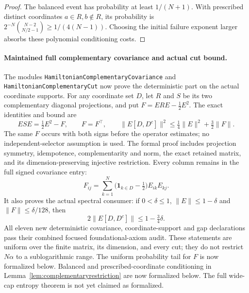 \begin{proof}
The balanced event has probability at least \(1/(N+1)\).
With prescribed distinct coordinates \(a\in R,b\notin R\),
its probability is
\(2^{-N}\binom{N-2}{N/2-1}\geq1/(4(N-1))\).
Choosing the initial failure exponent larger absorbs these
polynomial conditioning costs.
\end{proof}

\paragraph{Maintained full complementary covariance and actual cut bound.}
The modules \texttt{HamiltonianComplementaryCovariance} and
\texttt{HamiltonianComplementaryCut} now prove the deterministic
part on the actual coordinate supports.
For any coordinate set \(D\), let \(R\) and \(S\) be its two
complementary diagonal projections, and put
\(F=ERE-\tfrac12E^2\).
The exact identities and bound are
\[
 ESE=\tfrac12E^2-F,\qquad F=F^\top,\qquad
 \|E[D,D^c]\|^2\leq\tfrac14\|E\|^2+\tfrac32\|F\|.
\]
The same \(F\) occurs with both signs before the operator estimates;
no independent-selector assumption is used.
The formal proof includes projection symmetry, idempotence,
complementarity and norm, the exact retained matrix, and its
dimension-preserving injective restriction.
Every column remains in the full signed covariance entry:
\[
 F_{ij}=\sum_{k=1}^N
       \bigl(\mathbf1_{k\in D}-\tfrac12\bigr)E_{ik}E_{kj}.
\]
It also proves the actual spectral consumer:
if \(0<\delta\leq1\), \(\|E\|\leq1-\delta\) and
\(\|F\|\leq\delta/128\), then
\[
 2\|E[D,D^c]\|\leq1-\tfrac34\delta .
\]
All eleven new deterministic covariance, coordinate-support and
gap declarations pass their combined focused foundational-axiom audit.
These statements are uniform over the finite matrix, its dimension,
and every cut; they do not restrict \(N\alpha\) to a sublogarithmic
range. The uniform probability tail for \(F\) is now formalized below.
Balanced and prescribed-coordinate conditioning in
Lemma~\ref{lem:complementaryrestriction} are now formalized below.
The full wide-cap entropy theorem is not yet claimed as formalized.

